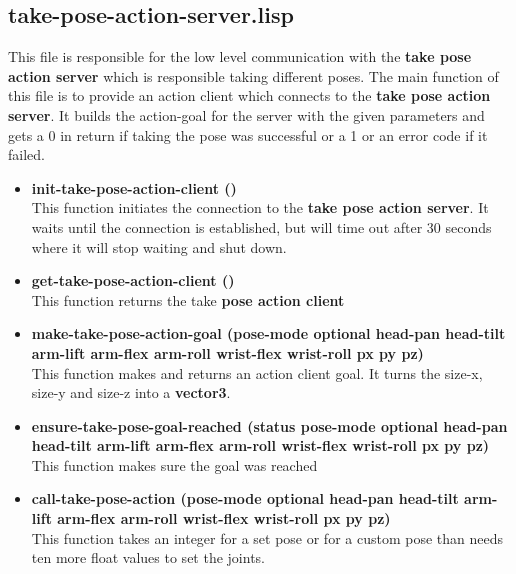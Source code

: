 \documentclass[main.tex]{subfiles}
\begin{document}
        \subsection{take-pose-action-server.lisp}
        This file is responsible for the low level communication with the
        \textbf{take pose action server} which is responsible taking different poses. The main function of this file is to provide an action client which connects to the \textbf{take pose action server}. It builds the action-goal for the server with the given parameters and gets a 0 in return if taking the pose was successful or a 1  or an error code if it failed.
        \begin{itemize}
            \item \textbf{init-take-pose-action-client ()} \\
            This function initiates the connection to the \textbf{take pose action server}. It waits until the connection is established, but will time out after 30 seconds where it will stop waiting and shut down. 
            \item \textbf{get-take-pose-action-client ()} \\
            This function returns the take \textbf{pose action client}
            \item \textbf{make-take-pose-action-goal (pose-mode optional head-pan head-tilt arm-lift arm-flex arm-roll wrist-flex wrist-roll px py pz)} \\
            This function makes and returns an action client goal. It turns the size-x, size-y and size-z into a \textbf{vector3}.
            \item \textbf{ensure-take-pose-goal-reached (status pose-mode optional head-pan head-tilt arm-lift arm-flex arm-roll wrist-flex wrist-roll px py pz)} \\
            This function makes sure the goal was reached
            \item \textbf{call-take-pose-action (pose-mode optional head-pan head-tilt arm-lift arm-flex arm-roll wrist-flex wrist-roll px py pz)} \\
            This function takes an integer for a set pose or for a custom pose than needs ten more float values to set the joints.
        \end{itemize}
\end{document}
